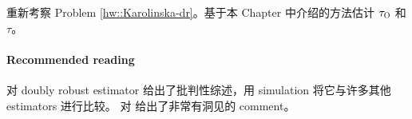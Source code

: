 重新考察 Problem \ref{hw::Karolinska-dr}。基于本 Chapter 中介绍的方法估计 $\tau_\textsc{O}$ 和 $\tau$。


 
 


 \paragraph{Recommended reading}
\citet{kang2007demystifying} 对 doubly robust estimator 给出了批判性综述，用 simulation 将它与许多其他 estimators 进行比较。\citet{robins2007comment} 对 \citet{kang2007demystifying} 给出了非常有洞见的 comment。
   
 
 
 
